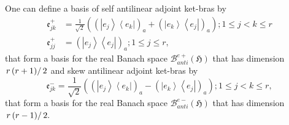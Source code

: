 \documentclass[aps,preprint]{revtex4}
\begin{document}
One can define a basis of self antilinear adjoint ket-bras by \emph{\ } 
\begin{align}
\mathfrak{e}_{jk}^{+} & =\frac{1}{\sqrt{2}}\left( \left( \left\vert
e_{j}\right\rangle \left\langle e_{k}\right\vert \right) _{a}+\left(
\left\vert e_{k}\right\rangle \left\langle e_{j}\right\vert \right)
_{a}\right) ;1\leq j<k\leq r \\
\mathfrak{e}_{jj}^{+} & =\left( \left\vert e_{j}\right\rangle \left\langle
e_{j}\right\vert \right) _{a};1\leq j\leq r,
\end{align}
that form a basis for the real Banach space $\mathcal{B}_{anti}^{e+}\left( 
\mathfrak{H}\right) $ that has dimension $\left. r\left( r+1\right) \right/
2 $ and skew antilinear adjoint ket-bras by%
\begin{equation}
\mathfrak{e}_{jk}^{-}=\frac{1}{\sqrt{2}}\left( \left( \left\vert
e_{j}\right\rangle \left\langle e_{k}\right\vert \right) _{a}-\left(
\left\vert e_{k}\right\rangle \left\langle e_{j}\right\vert \right)
_{a}\right) ;1\leq j<k\leq r,
\end{equation}
that form a basis for the real Banach space $\mathcal{B}_{anti}^{e-}\left( 
\mathfrak{H}\right) $ that has dimension $\left. r\left( r-1\right) \right/
2.$
\end{document}

